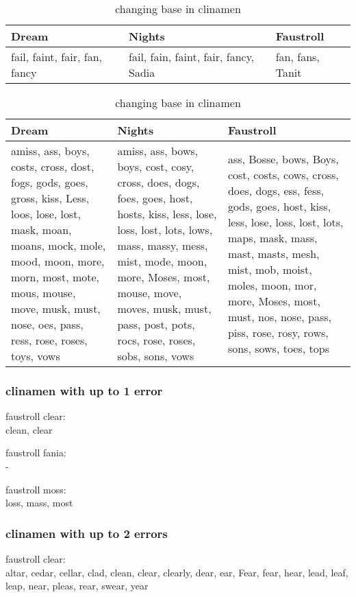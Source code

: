 \begin{table}
  \centering
  \begin{tabu}{X[l]X[1.5,l]X[l]}
  \toprule
  \textbf{Dream} & \textbf{Nights} & \textbf{Faustroll}\\
  \midrule
  fail, faint, fair, fan, fancy & fail, fain, faint, fair, fancy, Sadia & fan, fans, Tanit\\
  \bottomrule
  \end{tabu}
\caption[Changing base in clinamen]{changing base in clinamen}
\label{tab:basefania}
\end{table}

\begin{table}
  \centering
  \begin{tabu}{X[l]X[l]X[l]}
  \toprule
  \textbf{Dream} & \textbf{Nights} & \textbf{Faustroll}\\
  \midrule
  amiss, ass, boys, costs, cross, dost, fogs, gods, goes, gross, kiss, Less, loos, lose, lost, mask, moan, moans, mock, mole, mood, moon, more, morn, most, mote, mous, mouse, move, musk, must, nose, oes, pass, ress, rose, roses, toys, vows & amiss, ass, bows, boys, cost, cosy, cross, does, dogs, foes, goes, host, hosts, kiss, less, lose, loss, lost, lots, lows, mass, massy, mess, mist, mode, moon, more, Moses, most, mouse, move, moves, musk, must, pass, post, pots, rocs, rose, roses, sobs, sons, vows & ass, Bosse, bows, Boys, cost, costs, cows, cross, does, dogs, ess, fess, gods, goes, host, kiss, less, lose, loss, lost, lots, maps, mask, mass, mast, masts, mesh, mist, mob, moist, moles, moon, mor, more, Moses, most, must, nos, nose, pass, piss, rose, rosy, rows, sons, sows, toes, tops\\
  \bottomrule
  \end{tabu}
\caption[Changing base in clinamen]{changing base in clinamen}
\label{tab:basemoss}
\end{table}


\subsubsection{clinamen with up to 1 error}
faustroll clear:\\
clean, clear

faustroll fania:\\
-

faustroll moss:\\
loss, mass, most

\subsubsection{clinamen with up to 2 errors}
faustroll clear:\\
altar, cedar, cellar, clad, clean, clear, clearly, dear, ear, Fear, fear, hear, lead, leaf, leap, near, pleas, rear, swear, year


